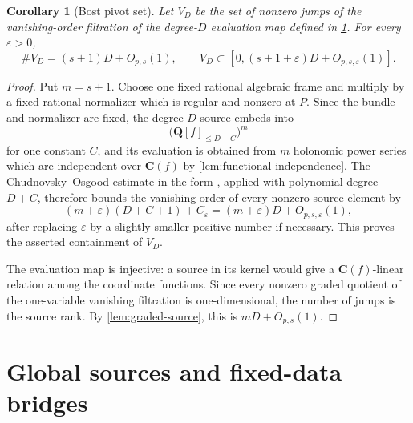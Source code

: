 \documentclass[11pt]{article}
\newtheorem{corollary}[corollary]{Corollary}
\theoremstyle{definition}
\theoremstyle{remark}
\newcommand{\Q}{\mathbf Q}
\newcommand{\C}{\mathbf C}
\begin{document}
\begin{corollary}[Bost pivot set]\label{cor:zero-estimate}
Let $V_D$ be the set of nonzero jumps of the vanishing-order filtration of the
degree-$D$ evaluation map defined in \cref{sec:sources}.  For every
$\varepsilon>0$,
\begin{equation}\label{eq:zero-estimate}
 \#V_D=(s+1)D+O_{p,s}(1),
 \qquad
 V_D\subset
 [0,(s+1+\varepsilon)D+O_{p,s,\varepsilon}(1)].
\end{equation}
\end{corollary}

\begin{proof}
Put $m=s+1$.  Choose one fixed rational algebraic frame and multiply by a
fixed rational normalizer which is regular and nonzero at $P$.  Since the
bundle and normalizer are fixed, the degree-$D$ source embeds into
\[
 \bigl(\Q[f]_{\le D+C}\bigr)^m
\]
for one constant $C$, and its evaluation is obtained from $m$ holonomic
power series which are independent over $\C(f)$ by
\cref{lem:functional-independence}.  The Chudnovsky--Osgood estimate in the
form \cite[Theorem~3.2.13]{CDT2024}, applied with polynomial degree $D+C$,
therefore bounds the vanishing order of every nonzero source element by
\[
 (m+\varepsilon)(D+C+1)+C_\varepsilon
 =(m+\varepsilon)D+O_{p,s,\varepsilon}(1),
\]
after replacing $\varepsilon$ by a slightly smaller positive number if
necessary.  This proves the asserted containment of $V_D$.

The evaluation map is injective: a source in its kernel would give a
$\C(f)$-linear relation among the coordinate functions.  Since every
nonzero graded quotient of the one-variable vanishing filtration is
one-dimensional, the number of jumps is the source rank.  By
\cref{lem:graded-source}, this is $mD+O_{p,s}(1)$.
\end{proof}

\section{Global sources and fixed-data bridges}\label{sec:sources}
\end{document}
